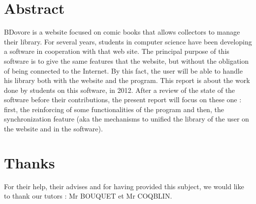 \newpage
\section*{Abstract}
BDovore is a website focused on comic books that allows collectors to manage their library. For several years, students in computer science have been developing a software in cooperation with that web site. The principal purpose of this software is to give the same features that the website, but without the obligation of being connected to the Internet. By this fact, the user will be able to handle his library both with the website and the program.
\newline This report is about the work done by students on this software, in 2012.
After a review of the state of the software before their contributions, the present report will focus on these one : first, the reinforcing of some functionalities of the program and then, the synchronization feature (aka the mechanisms to unified the library of the user on the website and in the software).

\section*{Thanks}
For their help, their advises and for having provided this subject, we would like to thank our tutors : Mr BOUQUET et Mr COQBLIN.